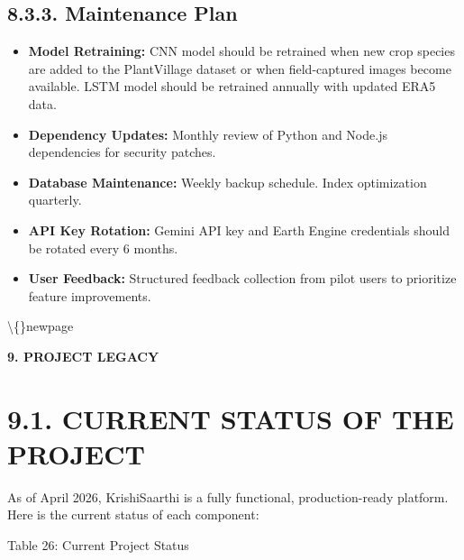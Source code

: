 \documentclass[12pt, a4paper]{report}
\begin{document}
\subsection{8.3.3. Maintenance Plan}
\begin{itemize}[leftmargin=*]
  \item \textbf{Model Retraining:} CNN model should be retrained when new crop species are added to the PlantVillage dataset or when field-captured images become available. LSTM model should be retrained annually with updated ERA5 data.
  \item \textbf{Dependency Updates:} Monthly review of Python and Node.js dependencies for security patches.
  \item \textbf{Database Maintenance:} Weekly backup schedule. Index optimization quarterly.
  \item \textbf{API Key Rotation:} Gemini API key and Earth Engine credentials should be rotated every 6 months.
  \item \textbf{User Feedback:} Structured feedback collection from pilot users to prioritize feature improvements.
\end{itemize}
\textbackslash\{\}newpage

\begin{center}
{\fontsize{14}{17}\bfseries 9. PROJECT LEGACY}\\
\end{center}
\section{9.1. CURRENT STATUS OF THE PROJECT}
As of April 2026, KrishiSaarthi is a fully functional, production-ready platform. Here is the current status of each component:

Table 26: Current Project Status
\end{document}
